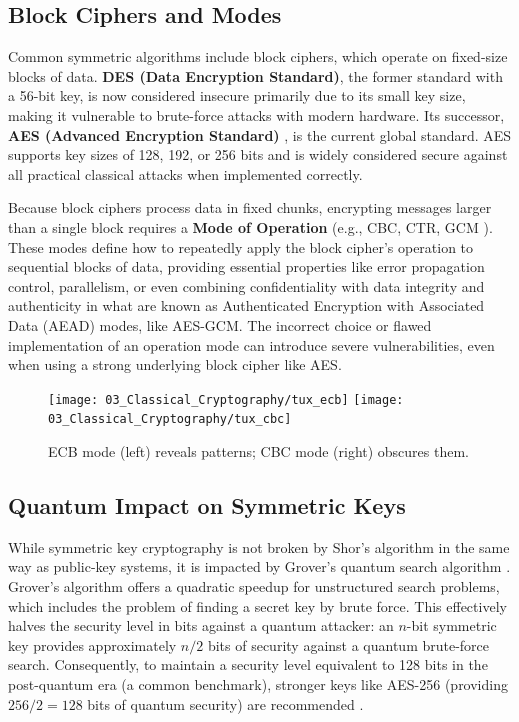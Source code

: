 \subsection{Block Ciphers and Modes}
Common symmetric algorithms include block ciphers, which operate on fixed-size blocks of data. \textbf{DES (Data Encryption Standard)}, the former standard with a 56-bit key, is now considered insecure primarily due to its small key size, making it vulnerable to brute-force attacks with modern hardware. Its successor, \textbf{AES (Advanced Encryption Standard)} \parencite{nist2001aes}, is the current global standard. AES supports key sizes of 128, 192, or 256 bits and is widely considered secure against all practical classical attacks when implemented correctly.

Because block ciphers process data in fixed chunks, encrypting messages larger than a single block requires a \textbf{Mode of Operation} (e.g., CBC, CTR, GCM \parencite{nist_sp800_38d}). These modes define how to repeatedly apply the block cipher's operation to sequential blocks of data, providing essential properties like error propagation control, parallelism, or even combining confidentiality with data integrity and authenticity in what are known as Authenticated Encryption with Associated Data (AEAD) modes, like AES-GCM. The incorrect choice or flawed implementation of an operation mode can introduce severe vulnerabilities, even when using a strong underlying block cipher like AES.

\begin{figure}[ht]
    \centering
    \texttt{[image: 03\_Classical\_Cryptography/tux\_ecb]}
    \texttt{[image: 03\_Classical\_Cryptography/tux\_cbc]}
    \caption{ECB mode (left) reveals patterns; CBC mode (right) obscures them.}
    \label{fig:ecb_vs_cbc}
\end{figure}

\subsection{Quantum Impact on Symmetric Keys}
While symmetric key cryptography is not broken by Shor's algorithm in the same way as public-key systems, it is impacted by Grover's quantum search algorithm \parencite{grover1996fast}. Grover's algorithm offers a quadratic speedup for unstructured search problems, which includes the problem of finding a secret key by brute force. This effectively halves the security level in bits against a quantum attacker: an $n$-bit symmetric key provides approximately $n/2$ bits of security against a quantum brute-force search. Consequently, to maintain a security level equivalent to 128 bits in the post-quantum era (a common benchmark), stronger keys like AES-256 (providing $256/2 = 128$ bits of quantum security) are recommended \parencite{bernstein2017post, nist_pqc}.

